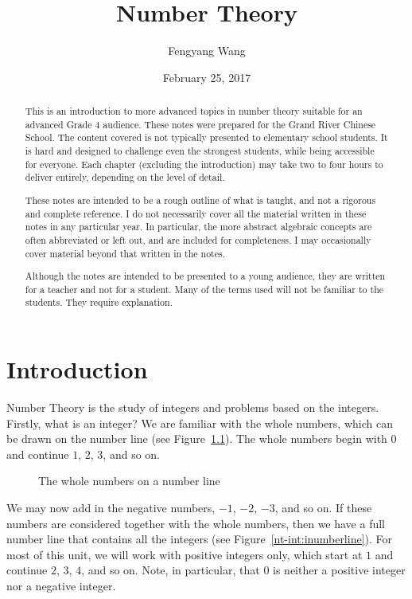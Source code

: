 \documentclass[a4paper,10pt]{report}
\title{Number Theory}
\author{Fengyang Wang}
\date{February 25, 2017}
\begin{document}
\begin{abstract}

This is an introduction to more advanced topics in number theory suitable for
an advanced Grade 4 audience. These notes were prepared for the Grand River
Chinese School. The content covered is not typically presented to elementary
school students. It is hard and designed to challenge even the strongest
students, while being accessible for everyone. Each chapter (excluding the
introduction) may take two to four hours to deliver entirely, depending on the
level of detail.

These notes are intended to be a rough outline of what is taught, and not a
rigorous and complete reference. I do not necessarily cover all the material
written in these notes in any particular year. In particular, the more abstract
algebraic concepts are often abbreviated or left out, and are included for
completeness. I may occasionally cover material beyond that written in the
notes.

Although the notes are intended to be presented to a young audience, they are
written for a teacher and not for a student. Many of the terms used will not be
familiar to the students. They require explanation.

\end{abstract}

\maketitle

\tableofcontents

\chapter{Introduction}

Number Theory is the study of \glspl{integer} and problems based on the
integers. Firstly, what is an integer? We are familiar with the whole numbers,
which can be drawn on the number line (see Figure~\ref{nt-int:pnumberline}).
The whole numbers begin with \(0\) and continue \(1\), \(2\), \(3\), and so on.

\begin{figure}

 \caption{The whole numbers on a number line}
 \label{nt-int:pnumberline}
\end{figure}

We may now add in the negative numbers, \(-1\), \(-2\), \(-3\), and so on. If
these numbers are considered together with the whole numbers, then we have a
full number line that contains all the integers (see
Figure~\ref{nt-int:inumberline}). For most of this unit, we will work with
positive integers only, which start at \(1\) and continue \(2\), \(3\), \(4\),
and so on. Note, in particular, that \(0\) is neither a positive integer nor a
negative integer.
\end{document}
